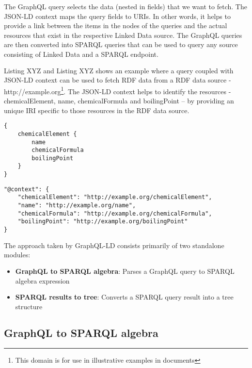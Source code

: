 The GraphQL query selects the data (nested in fields) that we want to fetch. The JSON-LD context maps the query fields to URIs. In other words, it helps to provide a link between the items in the nodes of the queries and the actual resources that exist in the respective Linked Data source. The GraphQL queries are then converted into SPARQL queries that can be used to query any source consisting of Linked Data and a SPARQL endpoint.

Listing XYZ and Listing XYZ shows an example where a query coupled with JSON-LD context can be used to fetch RDF data from a RDF data source - http://example.org\footnote{This domain is for use in illustrative examples in documents}. The JSON-LD context helps to identify the resources - chemicalElement, name, chemicalFormula and boilingPoint – by providing an unique IRI specific to those resources in the RDF data source.

\begin{minipage}{\linewidth}
\begin{lstlisting}[label=listing:listing6, caption={GraphQL query}]
{
	chemicalElement {
		name
		chemicalFormula
		boilingPoint
	}
}
\end{lstlisting}
\end{minipage}

\begin{minipage}{\linewidth}
\begin{lstlisting}[label=listing:listing7, caption={JSON-LD context}]
"@context": {
	"chemicalElement": "http://example.org/chemicalElement",
	"name": "http://example.org/name",
	"chemicalFormula": "http://example.org/chemicalFormula",
	"boilingPoint": "http://example.org/boilingPoint"
}
\end{lstlisting}
\end{minipage}

The approach taken by GraphQL-LD consists primarily of two standalone modules:
\begin{itemize}
	\item \textbf{GraphQL to SPARQL algebra}: Parses a GraphQL query to SPARQL algebra expression
	\item \textbf{SPARQL results to tree}: Converts a SPARQL query result into a tree structure
\end{itemize}


\subsection{GraphQL to SPARQL algebra}

